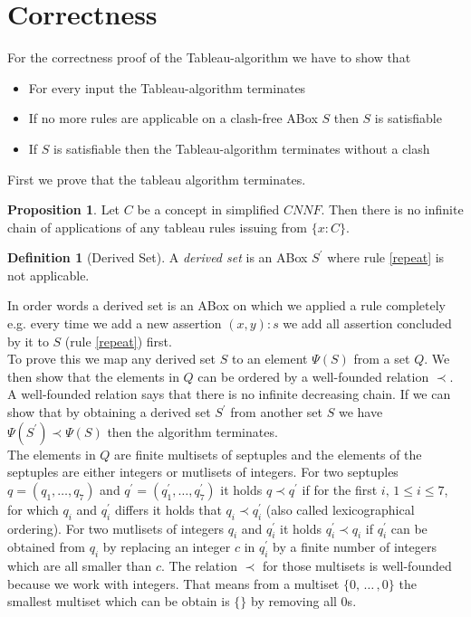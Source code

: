 \documentclass[a4paper,11pt]{scrartcl}
\theoremstyle{break}
\theoremstyle{definition}
\newtheorem{mydef}{Definition}
\newtheorem{mypro}{Proposition}
\begin{document}
\section{Correctness}
For the correctness proof of the Tableau-algorithm we have to show that
\begin{itemize}
\item For every input the Tableau-algorithm terminates
\item If no more rules are applicable on a clash-free ABox $S$ then $S$ is satisfiable
\item If $S$ is satisfiable then the Tableau-algorithm terminates without a clash
\end{itemize}
First we prove that the tableau algorithm terminates. 
\begin{mypro}
Let $C$ be a concept in simplified $CNNF$. Then there is no infinite chain of applications of any tableau rules issuing from $\{x:C\}$. 
\end{mypro}
\begin{mydef}[Derived Set]
A \textit{derived set} is an ABox $S^\prime$ where rule \ref{repeat} is not applicable.
\end{mydef}
In order words a derived set is an ABox on which we applied a rule completely e.g. every time we add a new assertion $(x,y):s$ we add all assertion concluded by it to $S$ (rule \ref{repeat}) first.\\
To prove this we map any derived set $S$ to an element $\Psi(S)$ from a set $Q$. We then show that the elements in $Q$ can be ordered by a well-founded relation $\prec$. A well-founded relation says that there is no infinite decreasing chain. If we can show that by obtaining a derived set $S^\prime$ from another set $S$ we have $\Psi(S^\prime)\prec\Psi(S)$ then the algorithm terminates.\\
The elements in $Q$ are finite multisets of septuples and the elements of the septuples are either integers or mutlisets of integers. For two septuples $q=(q_1,\dots,q_7)$ and $q^\prime=(q^\prime_1,\dots,q^\prime_7)$ it holds $q\prec q^\prime$ if for the first $i,\, 1\leq i\leq 7$, for which $q_i$ and $q_i^\prime$ differs it holds that $q_i\prec q_i^\prime$ (also called lexicographical ordering). For two mutlisets of integers $q_i$ and $q_i^\prime$ it holds $q_i^\prime\prec q_i$ if $q_i^\prime$ can be obtained from $q_i$ by replacing an integer $c$ in $q_i^\prime$ by a finite number of integers which are all smaller than $c$. The relation $\prec$ for those multisets is well-founded because we work with integers. That means from a multiset $\{0,\,\dots\,,0\}$ the smallest multiset which can be obtain is $\{\}$ by removing all $0$s.\\
\end{document}
